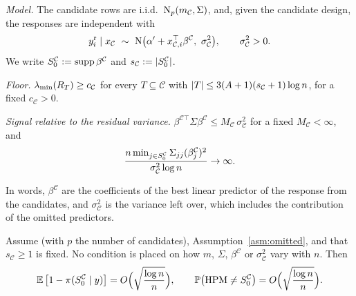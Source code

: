 \begin{localassumption}\label{asm:omitted}
\begin{asmitems}
  \item\label{asm:omitted-model} \emph{Model.} The candidate rows are i.i.d.\ $\mathrm{N}_p(m_{\mathcal C},\Sigma)$, and, given the
    candidate design, the responses are independent with
    \[
      \yr_i\mid x_{\mathcal C}\ \sim\ \Normal\big(\alpha'+x_{\mathcal C,i}^\top\beta^{\mathcal C},\ \sigma^2_{\mathcal C}\big),
      \qquad \sigma^2_{\mathcal C}>0 .
    \]
    We write $S_0^{\mathcal C}:=\operatorname{supp}\beta^{\mathcal C}$ and $s_{\mathcal C}:=\lvert S_0^{\mathcal C}\rvert$.
  \item\label{asm:omitted-floor} \emph{Floor.} $\lambda_{\min}(R_T)\ge c_{\mathcal C}$ for every $T\subseteq\mathcal C$ with
    $\lvert T\rvert\le3(A+1)(s_{\mathcal C}+1)\log n$, for a fixed $c_{\mathcal C}>0$.
  \item\label{asm:omitted-signal} \emph{Signal relative to the residual variance.}
    $\beta^{\mathcal C\top}\Sigma\beta^{\mathcal C}\le M_{\mathcal C}\,\sigma^2_{\mathcal C}$ for a fixed
    $M_{\mathcal C}<\infty$, and
    \[
      \frac{n\min_{j\in S_0^{\mathcal C}}\Sigma_{jj}(\beta^{\mathcal C}_j)^2}{\sigma^2_{\mathcal C}\log n}\to\infty .
    \]
\end{asmitems}
\end{localassumption}

In words, $\beta^{\mathcal C}$ are the coefficients of the best linear predictor of the response from the candidates,
and $\sigma^2_{\mathcal C}$ is the variance left over, which includes the contribution of the omitted predictors.

\begin{theorem}\label{thm:omitted}
Assume  (with $p$ the number of candidates), Assumption~\ref{asm:omitted}, and that $s_{\mathcal C}\ge1$ is fixed. No
condition is placed on how $m$, $\Sigma$, $\beta^{\mathcal C}$ or $\sigma^2_{\mathcal C}$ vary with $n$. Then
\begin{equation}\label{eq:omitted}
  \operatorname{\mathbb{E}}\big[1-\pi(S_0^{\mathcal C}\mid y)\big]=O\Big(\sqrt{\frac{\log n}{n}}\Big),\qquad
  \mathbb{P}\big(\mathrm{HPM}\neq S_0^{\mathcal C}\big)=O\Big(\sqrt{\frac{\log n}{n}}\Big).
\end{equation}
\end{theorem}

